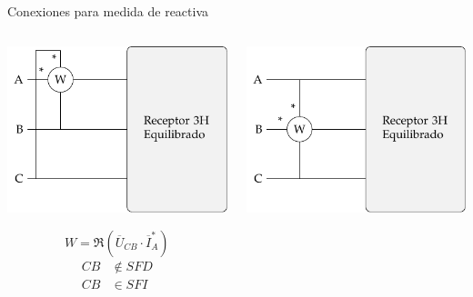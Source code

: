 \documentclass[xcolor={usenames,svgnames,dvipsnames}]{beamer}
\begin{document}
\begin{frame}[label={sec:orgebdcc0c}]{Conexiones para medida de reactiva}
\begin{columns}
\begin{column}{0.33\columnwidth}
\begin{center}
\includegraphics[width=.9\linewidth]{figs/Reactiva3H_A-CB.pdf}
\end{center}
\[
  W = \Re(\overline{U}_{CB} \cdot \overline{I}_A^*)
\]
\begin{align*}
  CB &\notin SFD\\
  CB &\in SFI
\end{align*}
\end{column}
\begin{column}{0.33\columnwidth}
\begin{center}
\includegraphics[width=.9\linewidth]{figs/Reactiva3H_B-AC.pdf}

\end{center}
\end{column}
\end{columns}
\end{frame}
\end{document}

